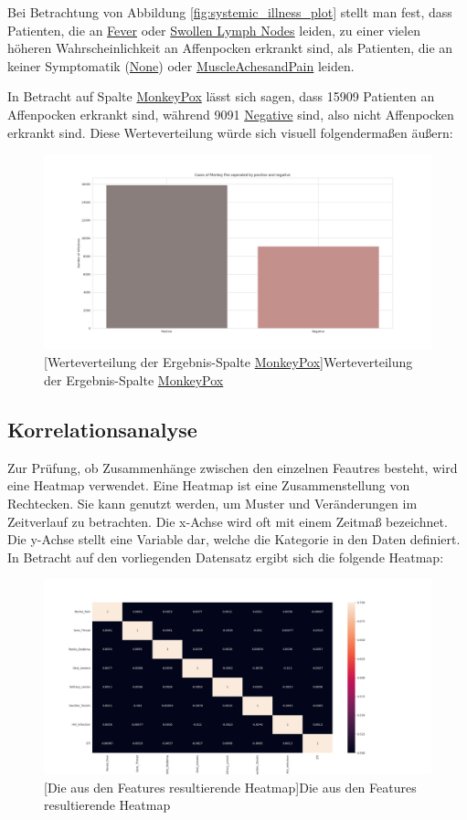 \documentclass[13pt,a4paper, listof=entryprefix, bibliography=totocnumbered,toc=listofnumbered,lof=listofnumbered]{scrartcl}
\begin{document}
	Bei Betrachtung von Abbildung \ref{fig:systemic_illness_plot} stellt man fest, dass Patienten, die an \url{Fever} oder \url{Swollen Lymph Nodes} leiden, zu einer
	vielen höheren Wahrscheinlichkeit an Affenpocken erkrankt sind, als Patienten, die an keiner Symptomatik (\url{None}) oder \url{MuscleAchesandPain} leiden.

	In Betracht auf Spalte \url{MonkeyPox} lässt sich sagen, dass 15909 Patienten an Affenpocken erkrankt sind, während 9091 \url{Negative} sind,
	also nicht Affenpocken erkrankt sind. Diese Werteverteilung würde sich visuell folgendermaßen äußern:

	\begin{figure}[H]
		\centering
		\includegraphics[width=0.8\linewidth]{Bilder/monkey_pox_plot.png}
		[Werteverteilung der Ergebnis-Spalte \url{MonkeyPox}]{Werteverteilung der Ergebnis-Spalte \url{MonkeyPox}}
		\label{fig:monkey_pox_plot}
	\end{figure}

	\subsection{Korrelationsanalyse}
		\label{ch:korrleations_analyse}

	Zur Prüfung, ob Zusammenhänge zwischen den einzelnen Feautres besteht, wird eine Heatmap verwendet. 
	Eine Heatmap ist eine Zusammenstellung von Rechtecken. Sie kann genutzt werden, um Muster und Veränderungen im
	Zeitverlauf zu betrachten. Die x-Achse wird oft mit einem Zeitmaß bezeichnet. Die y-Achse stellt eine Variable dar, 
	welche die Kategorie in den Daten definiert. In Betracht auf den vorliegenden Datensatz ergibt sich die folgende Heatmap:

	\begin{figure}[H]
		\centering
		\includegraphics[width=0.8\linewidth]{Bilder/heat_map.png}
		[Die aus den Features resultierende Heatmap]{Die aus den Features resultierende Heatmap}
		\label{fig:heatmap}
	\end{figure}
	
\end{document}
